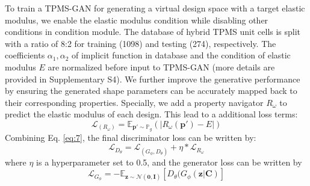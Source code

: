 \documentclass[preprint,review,12pt,authoryear]{elsarticle}
\begin{document}
To train a TPMS-GAN for generating a virtual design space with a target elastic modulus, we enable the elastic modulus condition while disabling other conditions in condition module. The database of hybrid TPMS unit cells is split with a ratio of 8:2 for training (1098) and testing (274), respectively. The coefficients $\alpha_1, \alpha_2$ of implicit function in database and the condition of elastic modulus $E$ are normalized before input to TPMS-GAN (more details are provided in Supplementary S4). We further improve the generative performance by ensuring the generated shape parameters can be accurately mapped back to their corresponding properties. Specially, we add a property navigator $R_\omega$ to predict the elastic modulus of each design. This lead to a additional loss terms:
\begin{equation}
\mathcal{L}_{(R_\omega)}=\mathbb{E}_{\boldsymbol{p}' \sim \mathbb{P}_g}(|R_\omega(\boldsymbol{p}')-E|)
\label{eq:18}
\end{equation}
Combining Eq. \ref{eq:7}, the final discriminator loss can be written by:
\begin{equation}
\mathcal{L}_{D_\theta} =  \mathcal{L}_{(G_\phi, D_\theta)} + \eta *\mathcal{L}_{R_\omega}
\label{eq:19}
\end{equation}
where $\eta$ is a hyperparameter set to 0.5, and the generator loss can be written by 
\begin{equation}
\mathcal{L}_{G_\phi} =  - \mathbb{E}_{\boldsymbol{z}\sim \mathcal{N}(\boldsymbol{0},\boldsymbol{I})} \left[ D_\theta (G_\phi(\boldsymbol{z}|\boldsymbol{C})\right]
\label{eq:20}
\end{equation}
\end{document}
